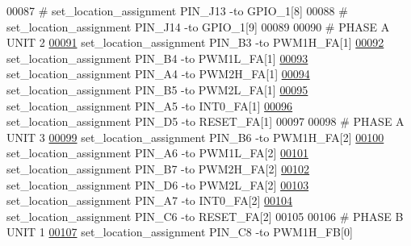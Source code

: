 \begin{DoxyCode}
00087 \textcolor{keyword}{# set\_location\_assignment PIN\_J13 -to GPIO\_1[8]}
00088 \textcolor{keyword}{# set\_location\_assignment PIN\_J14 -to GPIO\_1[9]}
00089 
00090 \textcolor{keyword}{# PHASE A UNIT 2}
\hypertarget{_d_e0___n_a_n_o___v_f_8qsf_source_l00091}{}\hyperlink{_d_e0___n_a_n_o___v_f_8qsf_a6405b1c2a0aed468b8e1772e22eb96fb}{00091} set\_location\_assignment PIN\_B3 -to PWM1H\_FA[1]
\hypertarget{_d_e0___n_a_n_o___v_f_8qsf_source_l00092}{}\hyperlink{_d_e0___n_a_n_o___v_f_8qsf_a8d8a2a83392e2938fdd7eaf606b9c4bd}{00092} set\_location\_assignment PIN\_B4 -to PWM1L\_FA[1]
\hypertarget{_d_e0___n_a_n_o___v_f_8qsf_source_l00093}{}\hyperlink{_d_e0___n_a_n_o___v_f_8qsf_ac8ffbed57c9b724f9be96194219f4833}{00093} set\_location\_assignment PIN\_A4 -to PWM2H\_FA[1]
\hypertarget{_d_e0___n_a_n_o___v_f_8qsf_source_l00094}{}\hyperlink{_d_e0___n_a_n_o___v_f_8qsf_a1031e2265ddbe254f406cf16fab20a55}{00094} set\_location\_assignment PIN\_B5 -to PWM2L\_FA[1]
\hypertarget{_d_e0___n_a_n_o___v_f_8qsf_source_l00095}{}\hyperlink{_d_e0___n_a_n_o___v_f_8qsf_ad6a2e45f73b8aef7a3696da550ea2990}{00095} set\_location\_assignment PIN\_A5 -to INT0\_FA[1]
\hypertarget{_d_e0___n_a_n_o___v_f_8qsf_source_l00096}{}\hyperlink{_d_e0___n_a_n_o___v_f_8qsf_a3b349a6efba801289084718b4ec49561}{00096} set\_location\_assignment PIN\_D5 -to RESET\_FA[1]
00097 
00098 \textcolor{keyword}{# PHASE A UNIT 3}
\hypertarget{_d_e0___n_a_n_o___v_f_8qsf_source_l00099}{}\hyperlink{_d_e0___n_a_n_o___v_f_8qsf_a6f468d89756a5212c792d965e104e6fb}{00099} set\_location\_assignment PIN\_B6 -to PWM1H\_FA[2]
\hypertarget{_d_e0___n_a_n_o___v_f_8qsf_source_l00100}{}\hyperlink{_d_e0___n_a_n_o___v_f_8qsf_a97daab08786c2327992453b3c3f284a3}{00100} set\_location\_assignment PIN\_A6 -to PWM1L\_FA[2]
\hypertarget{_d_e0___n_a_n_o___v_f_8qsf_source_l00101}{}\hyperlink{_d_e0___n_a_n_o___v_f_8qsf_a3146a98817c3e2e01ac48174d637135d}{00101} set\_location\_assignment PIN\_B7 -to PWM2H\_FA[2]
\hypertarget{_d_e0___n_a_n_o___v_f_8qsf_source_l00102}{}\hyperlink{_d_e0___n_a_n_o___v_f_8qsf_a5848eb9eca563ca81c90a4b12e353032}{00102} set\_location\_assignment PIN\_D6 -to PWM2L\_FA[2]
\hypertarget{_d_e0___n_a_n_o___v_f_8qsf_source_l00103}{}\hyperlink{_d_e0___n_a_n_o___v_f_8qsf_ae257be5062a820fa92de9cca08bc70f1}{00103} set\_location\_assignment PIN\_A7 -to INT0\_FA[2]
\hypertarget{_d_e0___n_a_n_o___v_f_8qsf_source_l00104}{}\hyperlink{_d_e0___n_a_n_o___v_f_8qsf_ab2080a5c310a28f2ceb277416ad86198}{00104} set\_location\_assignment PIN\_C6 -to RESET\_FA[2]
00105 
00106 \textcolor{keyword}{# PHASE B UNIT 1}
\hypertarget{_d_e0___n_a_n_o___v_f_8qsf_source_l00107}{}\hyperlink{_d_e0___n_a_n_o___v_f_8qsf_aae74323f630fe56033a8100db28f33e9}{00107} set\_location\_assignment PIN\_C8 -to PWM1H\_FB[0]

\end{DoxyCode}
